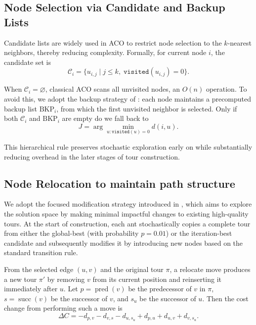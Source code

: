 \documentclass[a4paper,conference]{IEEEtran}
\newcommand{\calC}{\mathcal{C}}
\begin{document}
\subsection{Node Selection via Candidate and Backup Lists}
Candidate lists are widely used in ACO to restrict node selection to the $k$-nearest neighbors, thereby reducing complexity. Formally, for current node $i$, the candidate set is
\begin{equation}
\calC_i = \{u_{i,j} \mid j\le k,\; \texttt{visited}(u_{i,j})=0\}.
\end{equation}

When $\calC_i=\varnothing$, classical ACO scans all unvisited nodes, an $O(n)$ operation. To avoid this, we adopt the backup strategy of \cite{ACOTSP-MF}: each node maintains a precomputed backup list $\text{BKP}_i$, from which the first unvisited neighbor is selected. Only if both $\calC_i$ and $\text{BKP}_i$ are empty do we fall back to
\begin{equation}
J = \arg\min_{u:\texttt{visited}(u)=0} d(i,u).
\end{equation}

This hierarchical rule preserves stochastic exploration early on while substantially reducing overhead in the later stages of tour construction.

\subsection{Node Relocation to maintain path structure}
We adopt the focused modification strategy introduced in \cite{FACO2023}, which aims to explore the solution space by making minimal impactful changes to existing high-quality tours. At the start of construction, each ant stochastically copies a complete tour from either the global-best (with probability $p = 0.01$) or the iteration-best candidate and subsequently modifies it by introducing new nodes based on the standard transition rule.

From the selected edge $(u,v)$ and the original tour $\pi$, a relocate move produces a new tour $\pi'$ by removing $v$ from its current position and reinserting it immediately after $u$. Let $p=\operatorname{pred}(v)$ be the predecessor of $v$ in $\pi$, $s=\operatorname{succ}(v)$ be the successor of $v$, and $s_u$ be the successor of $u$. Then the cost change from performing such a move is
\begin{equation}
\Delta C = -d_{p,v} - d_{v,s} - d_{u,s_u} + d_{p,u} + d_{u,v} + d_{v,s_u}.
\end{equation}
\end{document}
